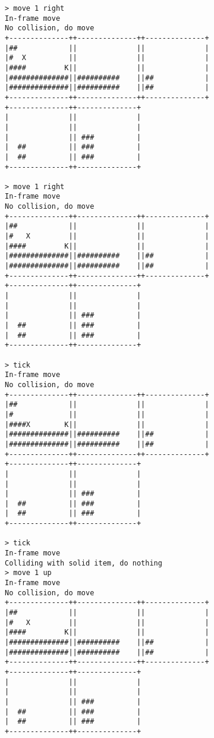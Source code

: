 \begin{verbatim}
> move 1 right
In-frame move
No collision, do move
+--------------++--------------++--------------+
|##            ||              ||              |
|#  X          ||              ||              |
|####         K||              ||              |
|##############||##########    ||##            |
|##############||##########    ||##            |
+--------------++--------------++--------------+
+--------------++--------------+                
|              ||              |                
|              ||              |                
|              || ###          |                
|  ##          || ###          |                
|  ##          || ###          |                
+--------------++--------------+                

> move 1 right
In-frame move
No collision, do move
+--------------++--------------++--------------+
|##            ||              ||              |
|#   X         ||              ||              |
|####         K||              ||              |
|##############||##########    ||##            |
|##############||##########    ||##            |
+--------------++--------------++--------------+
+--------------++--------------+                
|              ||              |                
|              ||              |                
|              || ###          |                
|  ##          || ###          |                
|  ##          || ###          |                
+--------------++--------------+                

> tick
In-frame move
No collision, do move
+--------------++--------------++--------------+
|##            ||              ||              |
|#             ||              ||              |
|####X        K||              ||              |
|##############||##########    ||##            |
|##############||##########    ||##            |
+--------------++--------------++--------------+
+--------------++--------------+                
|              ||              |                
|              ||              |                
|              || ###          |                
|  ##          || ###          |                
|  ##          || ###          |                
+--------------++--------------+                

> tick
In-frame move
Colliding with solid item, do nothing
> move 1 up
In-frame move
No collision, do move
+--------------++--------------++--------------+
|##            ||              ||              |
|#   X         ||              ||              |
|####         K||              ||              |
|##############||##########    ||##            |
|##############||##########    ||##            |
+--------------++--------------++--------------+
+--------------++--------------+                
|              ||              |                
|              ||              |                
|              || ###          |                
|  ##          || ###          |                
|  ##          || ###          |                
+--------------++--------------+                


\end{verbatim}
